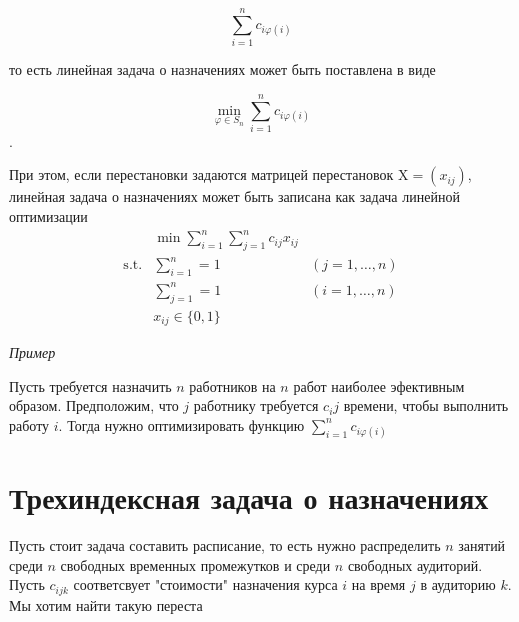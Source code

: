 \documentclass[10pt,a4paper]{article}
\begin{document}
\[
  \sum^n_{i = 1} c_{i \varphi (i)}
\]

то есть линейная задача о назначениях может быть поставлена в виде

\[
  \min_{\varphi \in S_n} \sum^n_{i = 1} c_{i \varphi (i)}
\].

При этом, если перестановки задаются матрицей перестановок $\mathrm{X} = (x_{ij})$,
линейная задача о назначениях может быть записана как задача линейной оптимизации
\begin{eqnarray*}
  & \min \sum^n_{i = 1} \sum^n_{j = 1} c_{ij} x_{ij} \\
  \text{s.t.} &\sum^n_{i = 1} = 1 &(j = 1, \ldots, n) \\
  &\sum^n_{j = 1} = 1 &(i = 1, \ldots, n) \\
  & x_{ij} \in \{ 0, 1 \}
\end{eqnarray*}

\textit{Пример}

Пусть требуется назначить $n$ работников на $n$ работ наиболее эфективным образом.
Предположим, что $j$ работнику требуется $c_ij$ времени, чтобы выполнить работу
$i$. Тогда нужно оптимизировать функцию
$\sum^n_{i = 1} c_{i \varphi(i)} $

\section{Трехиндексная задача о назначениях}

Пусть стоит задача составить расписание, то есть нужно распределить $n$ занятий
среди $n$ свободных временных промежутков и среди $n$ свободных аудиторий.
Пусть $c_{ijk}$ соответсвует "стоимости" назначения курса $i$ на время $j$
в аудиторию $k$. Мы хотим найти такую переста
\end{document}
